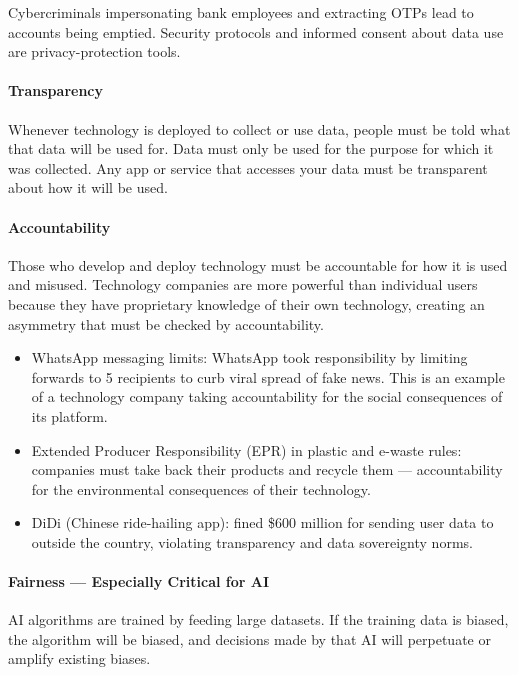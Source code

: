 \begin{ExampleBox}
Cybercriminals impersonating bank employees and extracting OTPs lead to accounts being emptied. Security protocols and informed consent about data use are privacy-protection tools.
\end{ExampleBox}

\paragraph{Transparency} Whenever technology is deployed to collect or use data, people must be told what that data will be used for. Data must only be used for the purpose for which it was collected. Any app or service that accesses your data must be transparent about how it will be used.

\paragraph{Accountability} Those who develop and deploy technology must be accountable for how it is used and misused. Technology companies are more powerful than individual users because they have proprietary knowledge of their own technology, creating an asymmetry that must be checked by accountability.

\begin{GovtPolicy}
\begin{itemize}
\item WhatsApp messaging limits: WhatsApp took responsibility by limiting forwards to 5 recipients to curb viral spread of fake news. This is an example of a technology company taking accountability for the social consequences of its platform.
\item Extended Producer Responsibility (EPR) in plastic and e-waste rules: companies must take back their products and recycle them --- accountability for the environmental consequences of their technology.
\item DiDi (Chinese ride-hailing app): fined \$600 million for sending user data to outside the country, violating transparency and data sovereignty norms.
\end{itemize}
\end{GovtPolicy}

\paragraph{Fairness --- Especially Critical for AI} AI algorithms are trained by feeding large datasets. If the training data is biased, the algorithm will be biased, and decisions made by that AI will perpetuate or amplify existing biases.

